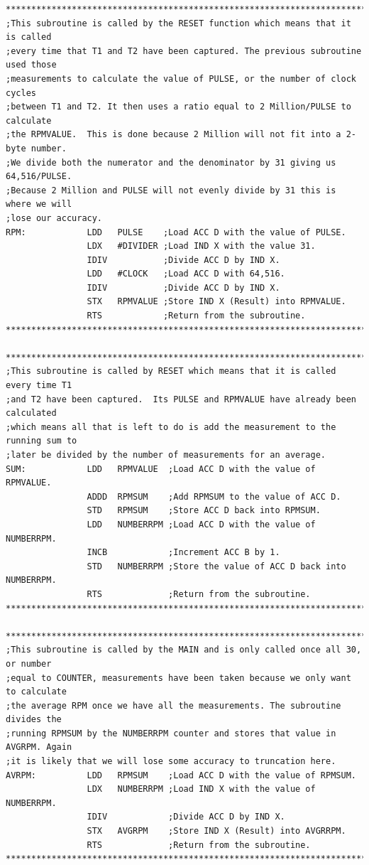 \documentclass[12pt]{report}
\begin{document}
\begin{Verbatim}[frame=single, fontsize=\footnotesize]
****************************************************************************************
;This subroutine is called by the RESET function which means that it is called
;every time that T1 and T2 have been captured. The previous subroutine used those
;measurements to calculate the value of PULSE, or the number of clock cycles
;between T1 and T2. It then uses a ratio equal to 2 Million/PULSE to calculate
;the RPMVALUE.  This is done because 2 Million will not fit into a 2-byte number.
;We divide both the numerator and the denominator by 31 giving us 64,516/PULSE.
;Because 2 Million and PULSE will not evenly divide by 31 this is where we will
;lose our accuracy.
RPM:            LDD   PULSE    ;Load ACC D with the value of PULSE.
                LDX   #DIVIDER ;Load IND X with the value 31.
                IDIV           ;Divide ACC D by IND X.
                LDD   #CLOCK   ;Load ACC D with 64,516.
                IDIV           ;Divide ACC D by IND X.
                STX   RPMVALUE ;Store IND X (Result) into RPMVALUE.
                RTS            ;Return from the subroutine.
****************************************************************************************

****************************************************************************************
;This subroutine is called by RESET which means that it is called every time T1
;and T2 have been captured.  Its PULSE and RPMVALUE have already been calculated
;which means all that is left to do is add the measurement to the running sum to
;later be divided by the number of measurements for an average.
SUM:            LDD   RPMVALUE  ;Load ACC D with the value of RPMVALUE.
                ADDD  RPMSUM    ;Add RPMSUM to the value of ACC D.
                STD   RPMSUM    ;Store ACC D back into RPMSUM.
                LDD   NUMBERRPM ;Load ACC D with the value of NUMBERRPM.
                INCB            ;Increment ACC B by 1.
                STD   NUMBERRPM ;Store the value of ACC D back into NUMBERRPM.
                RTS             ;Return from the subroutine.
****************************************************************************************

****************************************************************************************
;This subroutine is called by the MAIN and is only called once all 30, or number
;equal to COUNTER, measurements have been taken because we only want to calculate
;the average RPM once we have all the measurements. The subroutine divides the
;running RPMSUM by the NUMBERRPM counter and stores that value in AVGRPM. Again
;it is likely that we will lose some accuracy to truncation here.
AVRPM:          LDD   RPMSUM    ;Load ACC D with the value of RPMSUM.
                LDX   NUMBERRPM ;Load IND X with the value of NUMBERRPM.
                IDIV            ;Divide ACC D by IND X.
                STX   AVGRPM    ;Store IND X (Result) into AVGRRPM.
                RTS             ;Return from the subroutine.
****************************************************************************************


\end{Verbatim}
\end{document}
